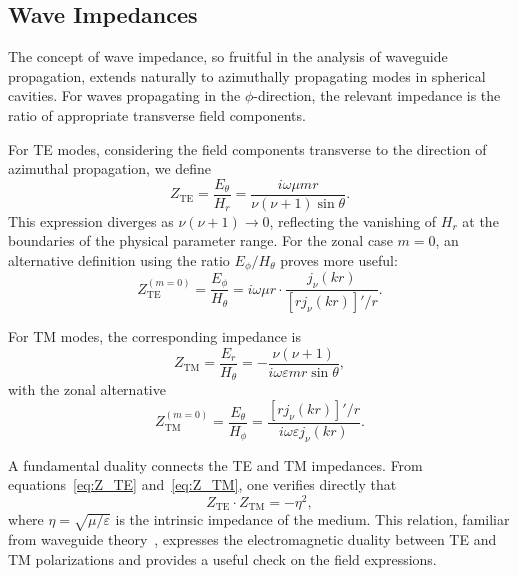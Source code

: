 \documentclass[
  aip,
  amsmath,amssymb,
  preprint
]{revtex4-1}
\begin{document}
\subsection{Wave Impedances}


The concept of wave impedance, so fruitful in the analysis of waveguide propagation, extends naturally to azimuthally propagating modes in spherical cavities. For waves propagating in the $\phi$-direction, the relevant impedance is the ratio of appropriate transverse field components.

For TE modes, considering the field components transverse to the direction of azimuthal propagation, we define
\begin{equation}
Z_{\text{TE}} = \frac{E_\theta}{H_r} = {\frac{i\omega\mu m r}{\nu(\nu+1)\sin\theta}}.
\label{eq:Z_TE}
\end{equation}
This expression diverges as $\nu(\nu+1) \to 0$, reflecting the vanishing of $H_r$ at the boundaries of the physical parameter range. For the zonal case $m = 0$, an alternative definition using the ratio $E_\phi/H_\theta$ proves more useful:
\begin{equation}
Z_{\text{TE}}^{(m=0)} = \frac{E_\phi}{H_\theta} = i\omega\mu r \cdot \frac{j_\nu(kr)}{[rj_\nu(kr)]'/r}.
\label{eq:Z_TE_zonal}
\end{equation}

For TM modes, the corresponding impedance is
\begin{equation}
Z_{\text{TM}} = \frac{E_r}{H_\theta} = {-\frac{\nu(\nu+1)}{i\omega\varepsilon m r \sin\theta}},
\label{eq:Z_TM}
\end{equation}
with the zonal alternative
\begin{equation}
Z_{\text{TM}}^{(m=0)} = \frac{E_\theta}{H_\phi} = \frac{[rj_\nu(kr)]'/r}{i\omega\varepsilon j_\nu(kr)}.
\label{eq:Z_TM_zonal}
\end{equation}

A fundamental duality connects the TE and TM impedances. From equations~\eqref{eq:Z_TE} and~\eqref{eq:Z_TM}, one verifies directly that
\begin{equation}
Z_{\text{TE}} \cdot Z_{\text{TM}} = -\eta^2,
\label{eq:impedance_duality}
\end{equation}
where $\eta = \sqrt{\mu/\varepsilon}$ is the intrinsic impedance of the medium. This relation, familiar from waveguide theory~\cite{Collin1991, Pozar2012}, expresses the electromagnetic duality between TE and TM polarizations and provides a useful check on the field expressions.
\end{document}
